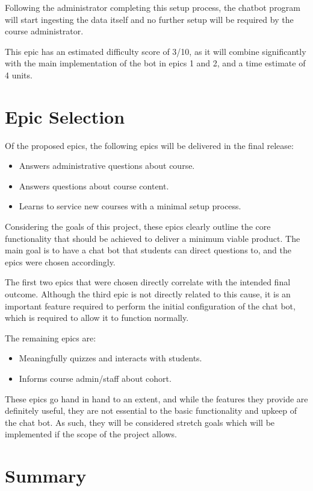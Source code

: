 \documentclass{article}
\begin{document}
Following the administrator completing this setup process, the chatbot program will start ingesting the data itself and no further setup will be required by the course administrator. 

This epic has an estimated difficulty score of 3/10, as it will combine significantly with the main implementation of the bot in epics 1 and 2, and a time estimate of 4 units.

\section{Epic Selection}

Of the proposed epics, the following epics will be delivered in the final release:
\begin{itemize}
  \item Answers administrative questions about course.
  \item Answers questions about course content.
  \item Learns to service new courses with a minimal setup process.
\end{itemize}

Considering the goals of this project, these epics clearly outline the core functionality that should be achieved to deliver a minimum viable product. The main goal is to have a chat bot that students can direct questions to, and the epics were chosen accordingly.

The first two epics that were chosen directly correlate with the intended final outcome. Although the third epic is not directly related to this cause, it is an important feature required to perform the initial configuration of the chat bot, which is required to allow it to function normally.

The remaining epics are:
\begin{itemize}
  \item Meaningfully quizzes and interacts with students.
  \item Informs course admin/staff about cohort.
\end{itemize}

These epics go hand in hand to an extent, and while the features they provide are definitely useful, they are not essential to the basic functionality and upkeep of the chat bot. As such, they will be considered stretch goals which will be implemented if the scope of the project allows.


\section{Summary}
\end{document}
